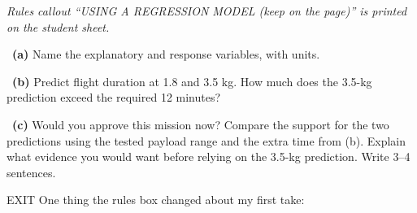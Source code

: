 \documentclass[11pt]{article}
\begin{document}
\textit{Rules callout ``USING A REGRESSION MODEL (keep on the page)'' is printed on the student sheet.}\par\medskip

~\textbf{(a)} Name the explanatory and response variables, with units.\par
{}

~\textbf{(b)} Predict flight duration at 1.8 and 3.5 kg. How much does the 3.5-kg prediction exceed the required 12 minutes?\par
{}

~\textbf{(c)} Would you approve this mission now? Compare the support for the two predictions using the tested payload range and the extra time from (b). Explain what evidence you would want before relying on the 3.5-kg prediction. Write 3--4 sentences.\par
{}

\begin{summaryexitbox}{EXIT}
One thing the rules box changed about my first take: \hrulefill
\end{summaryexitbox}
\end{document}
